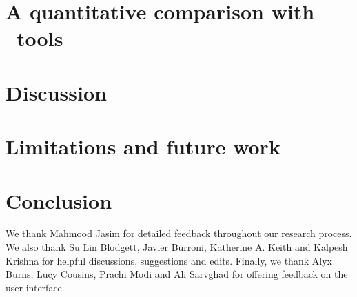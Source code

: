 \documentclass[acmsmall,screen]{acmart}
\begin{document}
\section{A quantitative comparison with \Baselongname~tools}\label{s:crowdstudy}


\section{Discussion}\label{s:discussion}



\section{Limitations and future work}\label{s:limits_and_future}



\section{Conclusion}\label{s:conclusion_cc}


\begin{acks}
We thank Mahmood Jasim for detailed feedback throughout our research process.  We also thank Su Lin Blodgett, Javier Burroni, Katherine A. Keith and Kalpesh Krishna for helpful discussions, suggestions and edits. Finally, we thank Alyx Burns, Lucy Cousins, Prachi Modi and Ali Sarvghad for offering feedback on the user interface.
\end{acks}






\appendix

\end{document}
